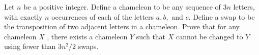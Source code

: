 Let $n$ be a positive integer. Define a chameleon to be any sequence of $3n$ letters, with exactly $n$ occurrences of each of the letters $a, b,$ and $c$. Define a swap to be the transposition of two adjacent letters in a chameleon. Prove that for any chameleon $X$ , there exists a chameleon $Y$ such that $X$ cannot be changed to $Y$ using fewer than $3n^2/2$ swaps.